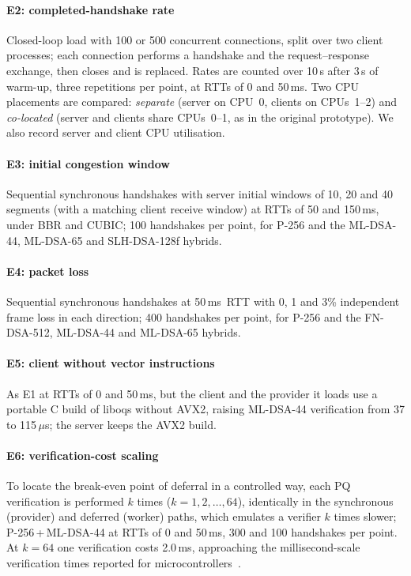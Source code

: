 \documentclass[preprint,10pt,3p]{elsarticle}
\newcommand{\ms}{\,ms}
\begin{document}
\paragraph{E2: completed-handshake rate} Closed-loop load with 100 or 500
concurrent connections, split over two client processes; each connection
performs a handshake and the request--response exchange, then closes and is
replaced.  Rates are counted over 10\,s after 3\,s of warm-up, three
repetitions per point, at RTTs of 0 and 50\ms.  Two CPU placements are
compared: \emph{separate} (server on CPU~0, clients on CPUs~1--2) and
\emph{co-located} (server and clients share CPUs~0--1, as in the original
prototype).  We also record server and client CPU utilisation.

\paragraph{E3: initial congestion window} Sequential synchronous
handshakes with server initial windows of 10, 20 and 40 segments (with a
matching client receive window) at RTTs of 50 and 150\ms, under BBR and
CUBIC; 100 handshakes per point, for P-256 and the ML-DSA-44, ML-DSA-65 and
SLH-DSA-128f hybrids.

\paragraph{E4: packet loss} Sequential synchronous handshakes at 50\ms\
RTT with 0, 1 and 3\% independent frame loss in each direction; 400
handshakes per point, for P-256 and the FN-DSA-512, ML-DSA-44 and ML-DSA-65
hybrids.

\paragraph{E5: client without vector instructions} As E1 at RTTs of 0 and
50\ms, but the client and the provider it loads use a portable C build of
liboqs without AVX2, raising ML-DSA-44 verification from 37 to
115\,$\mu$s; the server keeps the AVX2 build.

\paragraph{E6: verification-cost scaling} To locate the break-even point
of deferral in a controlled way, each PQ verification is performed $k$
times ($k = 1, 2, \dots, 64$), identically in the synchronous (provider)
and deferred (worker) paths, which emulates a verifier $k$ times slower;
P-256\,+\,ML-DSA-44 at RTTs of 0 and 50\ms, 300 and 100 handshakes per
point.  At $k = 64$ one verification costs 2.0\ms, approaching the
millisecond-scale verification times reported for microcontrollers~\cite{pqm4}.
\end{document}
